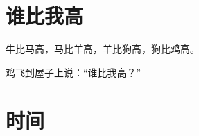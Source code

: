 \documentclass[12pt,UTF-8,openany]{ctexbook}
\begin{document}
\clearpage

\begin{center}
    
\end{center}


\hanzibox{}\hanzibox{}\hanzibox{}\hanzibox{}\hspace{1em}\hanzibox{}\hanzibox{}\hanzibox{}\hanzibox{}

\hanzibox{}\hanzibox{}\hanzibox{}\hanzibox{}\hspace{1em}\hanzibox{}\hanzibox{}\hanzibox{}\hanzibox{}

\hanzibox{}\hanzibox{}\hanzibox{}\hanzibox{}\hspace{1em}\hanzibox{}\hanzibox{}\hanzibox{}\hanzibox{}






\chapter{谁比我高}

\begin{large}
    
    牛比马高，马比羊高，羊比狗高，狗比鸡高。
    
    鸡飞到屋子上说：“谁比我高？”
    
\end{large}


\clearpage

\begin{center}
    
\end{center}


\hanzibox{}\hanzibox{}\hanzibox{}\hanzibox{}\hspace{1em}\hanzibox{}\hanzibox{}\hanzibox{}\hanzibox{}

\hanzibox{}\hanzibox{}\hanzibox{}\hanzibox{}\hspace{1em}\hanzibox{}\hanzibox{}\hanzibox{}\hanzibox{}






\chapter{时间}
\end{document}
